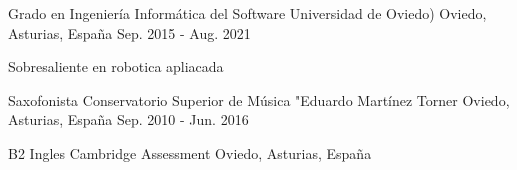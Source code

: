 

\begin{cventries}

  \cventry
    {Grado en Ingeniería Informática del Software} %
    {Universidad de Oviedo)} %
    {Oviedo, Asturias, España} %
    {Sep. 2015 - Aug. 2021} %
    {
      \begin{cvitems} %
        \item {Sobresaliente en robotica apliacada}
      \end{cvitems}
    }

    \cventry
    {Saxofonista} %
    {Conservatorio Superior de Música "Eduardo Martínez Torner} %
    {Oviedo, Asturias, España} %
    {Sep. 2010 - Jun. 2016} %
    {
      \begin{cvitems} %
      \end{cvitems}
    }

    \cventry
    {B2 Ingles} %
    {Cambridge Assessment} %
    {Oviedo, Asturias, España} %
    {} %
    {
      \begin{cvitems} %
      \end{cvitems}
    }

\end{cventries}
